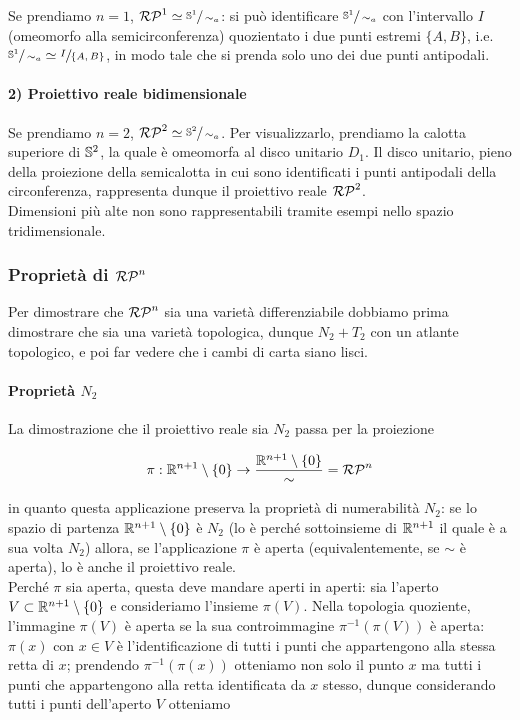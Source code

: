 Se prendiamo $ n=1 $, $ \rp{1} \simeq \sfrac{\S^{1}}{\sim_{a}} $: si può identificare $ \sfrac{\S^{1}}{\sim_{a}} $ con l'intervallo $ I $ (omeomorfo alla semicirconferenza) quozientato i due punti estremi $ \{A,B\} $, i.e. $ \sfrac{\S^{1}}{\sim_{a}} \simeq \sfrac{I}{\{A,B\}} $, in modo tale che si prenda solo uno dei due punti antipodali.

\paragraph{2) Proiettivo reale bidimensionale}

Se prendiamo $ n=2 $, $ \rp{2} \simeq \sfrac{\S^{2}}{\sim_{a}} $. Per visualizzarlo, prendiamo la calotta superiore di $ \S^{2} $, la quale è omeomorfa al disco unitario $ D_{1} $. Il disco unitario, pieno della proiezione della semicalotta in cui sono identificati i punti antipodali della circonferenza, rappresenta dunque il proiettivo reale $ \rp{2} $.\\
Dimensioni più alte non sono rappresentabili tramite esempi nello spazio tridimensionale.

\subsubsection{Proprietà di $ \rp{n} $}

Per dimostrare che $ \rp{n} $ sia una varietà differenziabile dobbiamo prima dimostrare che sia una varietà topologica, dunque $ N_{2}+T_{2} $ con un atlante topologico, e poi far vedere che i cambi di carta siano lisci.

\paragraph{Proprietà $ N_{2} $}

La dimostrazione che il proiettivo reale sia $ N_{2} $ passa per la proiezione

\begin{equation}
	\pi : \R^{n+1} \setminus \{0\} \to \dfrac{\R^{n+1} \setminus \{0\}}{\sim} = \rp{n}
\end{equation}

in quanto questa applicazione preserva la proprietà di numerabilità $ N_{2} $: se lo spazio di partenza $ \R^{n+1} \setminus \{0\} $ è $ N_{2} $ (lo è perché sottoinsieme di $ \R^{n+1} $ il quale è a sua volta $ N_{2} $) allora, se l'applicazione $ \pi $ è aperta (equivalentemente, se $ \sim $ è aperta), lo è anche il proiettivo reale.\\
Perché $ \pi $ sia aperta, questa deve mandare aperti in aperti: sia l'aperto $ V \subset \R^{n+1} \setminus \{0\} $ e consideriamo l'insieme $ \pi(V) $. Nella topologia quoziente, l'immagine $ \pi(V) $ è aperta se la sua controimmagine $ \pi^{-1}(\pi(V)) $ è aperta: $ \pi(x) $ con $ x \in V $ è l'identificazione di tutti i punti che appartengono alla stessa retta di $ x $; prendendo $ \pi^{-1}(\pi(x)) $ otteniamo non solo il punto $ x $ ma tutti i punti che appartengono alla retta identificata da $ x $ stesso, dunque considerando tutti i punti dell'aperto $ V $ otteniamo

